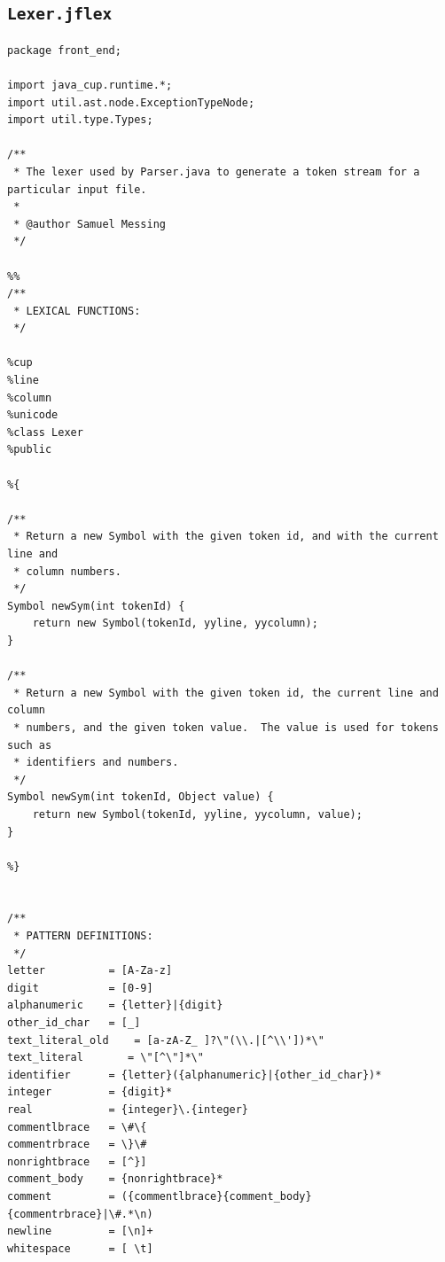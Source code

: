 \documentclass{book}
\begin{document}
\subsection{\texttt{Lexer.jflex}}

\begin{verbatim}
package front_end;

import java_cup.runtime.*;
import util.ast.node.ExceptionTypeNode;
import util.type.Types;

/**
 * The lexer used by Parser.java to generate a token stream for a particular input file.
 *
 * @author Samuel Messing
 */

%%
/**
 * LEXICAL FUNCTIONS:
 */

%cup
%line
%column
%unicode
%class Lexer
%public

%{

/**
 * Return a new Symbol with the given token id, and with the current line and
 * column numbers.
 */
Symbol newSym(int tokenId) {
    return new Symbol(tokenId, yyline, yycolumn);
}

/**
 * Return a new Symbol with the given token id, the current line and column
 * numbers, and the given token value.  The value is used for tokens such as
 * identifiers and numbers.
 */
Symbol newSym(int tokenId, Object value) {
    return new Symbol(tokenId, yyline, yycolumn, value);
}

%}


/**
 * PATTERN DEFINITIONS:
 */
letter          = [A-Za-z]
digit           = [0-9]
alphanumeric    = {letter}|{digit}
other_id_char   = [_]
text_literal_old    = [a-zA-Z_ ]?\"(\\.|[^\\'])*\" 
text_literal       = \"[^\"]*\"
identifier      = {letter}({alphanumeric}|{other_id_char})*
integer         = {digit}*
real            = {integer}\.{integer}
commentlbrace   = \#\{
commentrbrace   = \}\#
nonrightbrace   = [^}]
comment_body    = {nonrightbrace}*
comment         = ({commentlbrace}{comment_body}{commentrbrace}|\#.*\n)
newline         = [\n]+
whitespace      = [ \t]



\end{verbatim}
\end{document}
